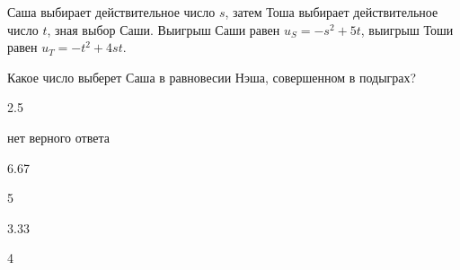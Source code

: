 
\begin{question}
Саша выбирает действительное число \(s\), затем Тоша выбирает действительное число \(t\), зная выбор Саши.
Выигрыш Саши равен \(u_S = -s^2 + 5t\), выигрыш Тоши равен \(u_T = -t^2 + 4 st\).

Какое число выберет Саша в равновесии Нэша, совершенном в подыграх?
\begin{answerlist}
  \item 2.5
  \item нет верного ответа
  \item 6.67
  \item 5
  \item 3.33
  \item 4
\end{answerlist}
\end{question}


